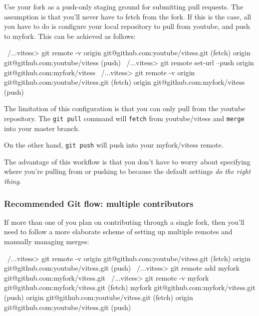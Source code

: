 Use your fork as a push-only staging ground for submitting pull requests. The
assumption is that you'll never have to fetch from the fork. If this is the
case, all you have to do is configure your local repository to pull from
youtube, and push to myfork. This can be achieved as follows:

\begin{codesample2}
  ~/...vitess> git remote -v
  origin  git@github.com:youtube/vitess.git (fetch)
  origin  git@github.com:youtube/vitess (push)
  ~/...vitess> git remote set-url --push origin git@github.com:myfork/vitess
  ~/...vitess> git remote -v
  origin  git@github.com:youtube/vitess.git (fetch)
  origin  git@github.com:myfork/vitess (push)
\end{codesample2}

The limitation of this configuration is that you can only pull from the youtube
repository. The {\tt git pull} command will {\tt fetch} from youtube/vitess and {\tt merge}
into your master branch.

On the other hand, {\tt git push} will push into your myfork/vitess remote.

The advantage of this workflow is that you don't have to worry about specifying
where you're pulling from or pushing to because the default settings \emph{do the
right thing}.

\subsubsection{Recommended Git flow: multiple contributors}\hypertarget{recommended-git-flow-multiple-contributors}{}\label{recommended-git-flow-multiple-contributors}

If more than one of you plan on contributing through a single fork, then you'll
need to follow a more elaborate scheme of setting up multiple remotes and
manually managing merges:

\begin{codesample2}
  ~/...vitess> git remote -v
  origin  git@github.com:youtube/vitess.git (fetch)
  origin  git@github.com:youtube/vitess.git (push)
  ~/...vitess> git remote add myfork git@github.com:myfork/vitess.git
  ~/...vitess> git remote -v
  myfork  git@github.com:myfork/vitess.git (fetch)
  myfork  git@github.com:myfork/vitess.git (push)
  origin  git@github.com:youtube/vitess.git (fetch)
  origin  git@github.com:youtube/vitess.git (push)
\end{codesample2}



